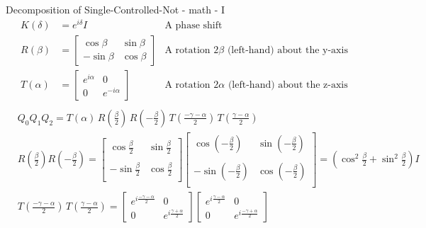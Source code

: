\documentclass{beamer}
\begin{document}
\begin{frame}{Decomposition of Single-Controlled-Not - math - I}
  {\tiny
    \begin{align*}
      K(\delta) &= e^{i\delta}I & \mbox{A phase shift} \\
      R(\beta)  &= \begin{bmatrix} \cos\beta & \sin\beta \\ -\sin\beta & \cos\beta \end{bmatrix}  & \mbox{A rotation $2\beta$ (left-hand) about the y-axis} \\
      T(\alpha) &= \begin{bmatrix} e^{i\alpha} & 0 \\ 0 & e^{-i\alpha} \end{bmatrix} & \mbox{A rotation $2\alpha$ (left-hand) about the z-axis} \\
    \end{align*}
    \begin{align*}
      & Q_0 Q_1 Q_2 = T(\alpha) \, R(\frac{\beta}{2}) \, R(-\frac{\beta}{2}) \, T(\frac{-\gamma - \alpha}{2}) \, T(\frac{\gamma - \alpha}{2}) \\
      & R(\frac{\beta}{2}) R(-\frac{\beta}{2})
      =
      \begin{bmatrix} 
        \cos \frac{\beta}{2} & \sin \frac{\beta}{2} \\
        \\
        -\sin \frac{\beta}{2} & \cos \frac{\beta}{2} \\
      \end{bmatrix} 
      \begin{bmatrix} 
        \cos (-\frac{\beta}{2}) & \sin (-\frac{\beta}{2}) \\
        \\
        -\sin (-\frac{\beta}{2}) & \cos (-\frac{\beta}{2}) \\
      \end{bmatrix} 
      =
      (\cos^2 \frac{\beta}{2} + \sin ^2 \frac{\beta}{2}) I
      \\
      & T(\frac{-\gamma - \alpha}{2}) \, T(\frac{\gamma - \alpha}{2})
      =
      \begin{bmatrix} 
        e^{i\frac{-\gamma - \alpha}{2}} & 0 \\
        0 & e^{i\frac{\gamma + \alpha}{2}}
      \end{bmatrix} 
      \begin{bmatrix} 
        e^{i\frac{\gamma - \alpha}{2}} & 0 \\
        0 & e^{i\frac{-\gamma + \alpha}{2}}

\end{bmatrix}
\end{align*}}
\end{frame}
\end{document}
